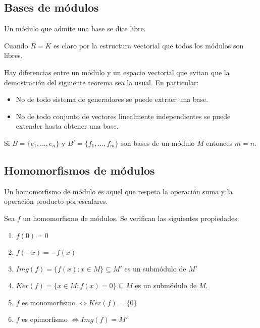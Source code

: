 \subsection{Bases de módulos}

\begin{definition}
Un módulo que admite una base se dice libre. 
\end{definition}

\begin{example}
Cuando $R = K$ es claro por la estructura vectorial que todos los módulos son libres.
\end{example}

Hay diferencias entre un módulo y un espacio vectorial que evitan que la demostración del siguiente teorema sea la usual. En particular:

\begin{itemize}
\item No de todo sistema de generadores se puede extraer una base. 
\item No de todo conjunto de vectores linealmente independientes se puede extender hasta obtener una base. 
\end{itemize}

\begin{theorem}
Si $B = \{e_1,\ldots,e_n \}$ y $B' = \{f_1,\ldots,f_m \}$ son bases de un módulo $M$ entonces $m = n$. 
\end{theorem}

\subsection{Homomorfismos de módulos}

\begin{definition}
Un homomorfismo de módulo es aquel que respeta la operación suma y la operación producto por escalares.
\end{definition}

\begin{proposition}
Sea $f$ un homomorfismo de módulos. Se verifican las siguientes propiedades:

\begin{enumerate}
\item $f(0) = 0$
\item $f(-x) = -f(x)$
\item $Img(f) = \{f(x):x \in M \} \subseteq M'$ es un submódulo de $M'$
\item $Ker(f) = \{x \in M:f(x) = 0 \} \subseteq M$ es un submódulo de $M$.
\item $f$ es monomorfismo $\iff Ker(f) = \{0\}$
\item $f$ es epimorfismo $\iff Img(f) = M'$
\end{enumerate}
\end{proposition}


